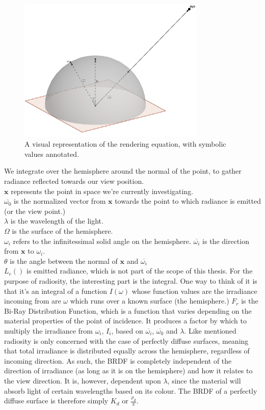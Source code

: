 \begin{figure}[!ht]
  \centering
    \includegraphics[width=0.8\textwidth]{img/rendering-eq}
    \caption{A visual representation of the rendering equation, with symbolic values annotated.}
    \label{fig-rendering-eq}
\end{figure}

We integrate over the hemisphere around the normal of the point, to gather radiance reflected towards our view position.\\
$\mathbf{x}$ represents the point in space we're currently investigating.\\
$\overline{\omega_0}$ is the normalized vector from $\mathbf{x}$ towards the point to which radiance is emitted (or the view point.)\\
$\lambda$ is the wavelength of the light.\\
$\Omega$ is the surface of the hemisphere.\\
$\omega_i$ refers to the infinitessimal solid angle on the hemisphere.
$\overline{\omega_i}$ is the direction from $\mathbf{x}$ to $\omega_i$.\\
$\theta$ is the angle between the normal of $\mathbf{x}$ and $\overline{\omega_i}$\\

$L_e()$ is emitted radiance, which is not part of the scope of this thesis. For the purpose of radiosity, the interesting part is the integral. One way to think of it is that it's an integral of a function $I(\omega)$ whose function values are the irradiance incoming from are $\omega$ which runs over a known surface (the hemisphere.) $F_r$ is the Bi-Ray Distribution Function, which is a function that varies depending on the material properties of the point of incidence. It produces a factor by which to multiply the irradiance from $\omega_i$, $I_i$, based on $\overline{\omega_i}$, $\overline{\omega_0}$ and $\lambda$. Like mentioned radiosity is only concerned with the case of perfectly diffuse surfaces, meaning that total irradiance is distributed equally across the hemisphere, regardless of incoming direction. As such, the BRDF is completely independent of the direction of irradiance (as long as it is on the hemisphere) and how it relates to the view direction. It is, however, dependent upon $\lambda$, since the material will absorb light of certain wavelengths based on its colour. The BRDF of a perfectly diffuse surface is therefore simply $K_d$ or $\frac{\rho_d}{\pi}$.

